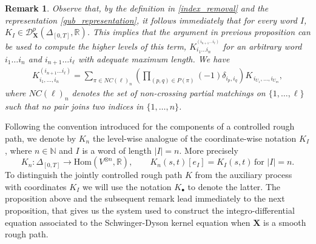 \documentclass{article}%
\newtheorem{remark}[theorem]{Remark}
\begin{document}
\begin{remark}\label{remark_smooth_numerical}
Observe that, by the definition in \eqref{index_removal} and the representation \eqref{gub_representation}, it follows immediately that for every word $I$, $K_I \in \mathcal{D}^p_{\mathbf{X}}(\Delta_{[0,T]}, \mathbb{R})$.
    This implies that the argument in previous proposition can be used to compute the higher levels of this term, $K^{^{(i_{n+1} \dots i_\ell)}}_{i_1 \dots i_n}$ for an arbitrary word $i_1 \dots i_n$ and $i_{n+1} \dots i_\ell$ with adequate maximum length. We have
    \begin{align*}
        K_{i_1,\ldots,i_{n}}^{(i_{n+1} \dots i_\ell)} = \sum_{\pi \in NC(\ell)_n}
\left(
\prod_{(p,q) \in P(\pi)} (-1) \delta_{i_p,i_q}
\right)
K_{\,i_{U_1},\ldots,i_{U_m}},
    \end{align*}
where \(NC(\ell)_n\) denotes the set of non-crossing partial matchings on \(\{1,\dots,\ell\}\) such that no pair joins two indices in \(\{1,\dots,n\}\).
\end{remark}
Following the convention introduced for the components of a controlled rough path, we denote by $K_n$ the level-wise analogue of the coordinate-wise notation $K_I$, where $n \in \mathbb{N}$ and $I$ is a word of length $|I| = n$. More precisely 
\[
K_n: \Delta_{[0, T]} \to \mathrm{Hom}(V^{\otimes n}, \mathbb{R}), \qquad K_n(s,t)[e_I] = K_I(s,t)\, \text{for }|I|=n .
\]
\newline
To distinguish the jointly controlled rough path $K$ from the auxiliary process with coordinates $K_I$ we will use the notation $K_\bullet$ to denote the latter.\newline
The proposition above and the subsequent remark lead immediately to the next proposition, that gives us the system used to construct the integro-differential equation associated to the Schwinger-Dyson kernel equation when $\mathbf{X}$ is a smooth rough path.
\end{document}
